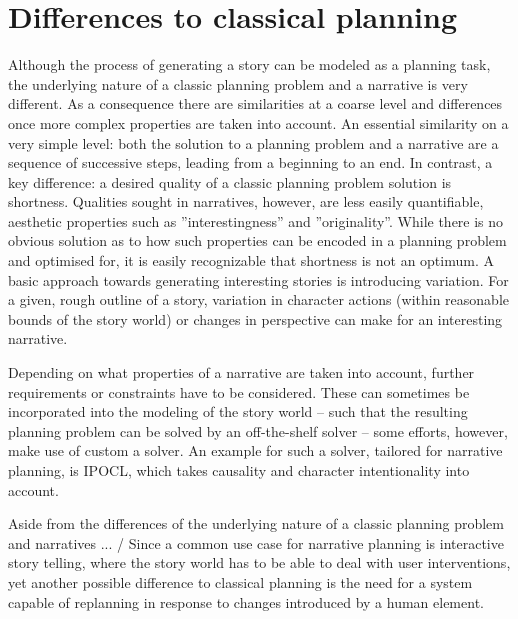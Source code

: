 \section{Differences to classical planning}\label{differences}
Although the process of generating a story can be modeled as a planning task, the underlying nature of a classic planning problem and a narrative is very different. As a consequence there are similarities at a coarse level and differences once more complex properties are taken into account. An essential similarity on a very simple level: both the solution to a planning problem and a narrative are a sequence of successive steps, leading from a beginning to an end. In contrast, a key difference: a desired quality of a classic planning problem solution is shortness. Qualities sought in narratives, however, are less easily quantifiable, aesthetic properties such as ''interestingness'' and ''originality''. While there is no obvious solution as to how such properties can be encoded in a planning problem and optimised for, it is easily recognizable that shortness is not an optimum. A basic approach towards generating interesting stories is introducing variation. For a given, rough outline of a story, variation in character actions (within reasonable bounds of the story world) or changes in perspective can make for an interesting narrative.

Depending on what properties of a narrative are taken into account, further requirements or constraints have to be considered. These can sometimes be incorporated into the modeling of the story world -- such that the resulting planning problem can be solved by an off-the-shelf solver -- some efforts, however, make use of custom a solver. An example for such a solver, tailored for narrative planning, is IPOCL\cite{Riedl04}, which takes causality and character intentionality into account.

Aside from the differences of the underlying nature of a classic planning problem and narratives ... / Since a common use case for narrative planning is interactive story telling, where the story world has to be able to deal with user interventions, yet another possible difference to classical planning is the need for a system capable of replanning in response to changes introduced by a human element.
%
%
%
